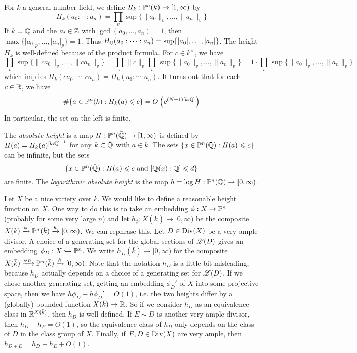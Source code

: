 \documentclass{article}
\begin{document}
For $k$ a general number field, we define $H_k:\mathbb{P}^n(k)\to [1,\infty)$ by 
\[
  H_k(a_0:\cdots:a_n) = \prod_v \sup\{ \|a_0\|_v,\dots,\|a_n\|_v\}
\]
If $k=\mathbb{Q}$ and the $a_i\in \mathbb{Z}$ with $\gcd(a_0,\dots,a_n)=1$, then 
$\max\{|a_0|_p,\dots,|a_n|_p\}=1$. Thus 
$H_{\mathbb{Q}}(a_0:\cdots:a_n)=\sup\{|a_0|,\dots,|a_n|\}$. The height $H_k$ is 
well-defined because of the product formula. For $c\in k^\times$, we have 
\[
  \prod_v \sup\{\|ca_0\|_v,\dots,\|ca_n\|_v\} = \prod_v \|c\|_v \prod_v \sup\{\|a_0\|_v,\dots,\|a_n\|_v\} = 1\cdot \prod_v \sup\{\|a_0\|_v,\dots,\|a_n\|_v\}
\]
which implies $H_k(c a_0:\cdots:c a_n)=H_k(a_0:\cdots:a_n)$. It turns out that 
for each $c\in \mathbb{R}$, we have  
\[
  \#\{a\in \mathbb{P}^n(k) : H_k(a)\leqslant c\} = O\left(c^{(N+1)[k:\mathbb{Q}]}\right)
\]
In particular, the set on the left is finite. 

The \emph{absolute height} is a map $H:\mathbb{P}^n(\bar{\mathbb{Q}})\to [1,\infty)$ is defined 
by $H(a) = H_k(a)^{[k:\mathbb{Q}]^{-1}}$ for any $k\subset \bar{\mathbb{Q}}$ with $a\in k$. 
The sets $\{x\in \mathbb{P}^n(\bar{\mathbb{Q}}):H(a)\leqslant c\}$ can be infinite, but the 
sets 
\[
  \{x\in \mathbb{P}^n(\bar{\mathbb{Q}}):H(a)\leqslant c\text{ and } [\mathbb{Q}(x):\mathbb{Q}]\leqslant d\}
\]
are finite. The \emph{logarithmic absolute height} is the map 
$h=\log H:\mathbb{P}^n(\bar{\mathbb{Q}})\to [0,\infty)$. 

Let $X$ be a nice variety over $k$. We would like to define a reasonable height 
function on $X$. One way to do this is to take an embedding $\phi:X\to \mathbb{P}^n$ 
(probably for some very large $n$) and let $h_\phi:X(\bar k)\to [0,\infty)$ be 
the composite $X(k) \xrightarrow\phi \mathbb{P}^n(\bar k) \xrightarrow{h} [0,\infty)$. 
We can rephrase this. Let $D\in \operatorname{Div}(X)$ be a very ample divisor. A choice of a 
generating set for the global sections of $\mathscr{L}(D)$ gives an embedding 
$\phi_D:X\hookrightarrow \mathbb{P}^n$. We write $h_D(\bar k)\to [0,\infty)$ for the 
composite 
$X(\bar k) \xrightarrow{\phi_D} \mathbb{P}^n(\bar k)\xrightarrow{h} [0,\infty)$. Note 
that the notation $h_D$ is a little bit misleading, because $h_D$ actually 
depends on a choice of a generating set for $\mathscr{L}(D)$. If we chose another 
generating set, getting an embedding $\phi_D'$ of $X$ into some projective 
space, then we have $h \phi_D - h \phi_D'=O(1)$, i.e. the two heights differ by 
a (globally) bounded function $X(\bar k)\to \mathbb{R}$. So if we consider 
$h_D$ as an equivalence class in $\mathbb{R}^{X(\bar k)}$, then $h_D$ is well-defined. 
If $E\sim D$ is another very ample divisor, then $h_D-h_E=O(1)$, so the 
equivalence class of $h_D$ only depends on the class of $D$ in the class group 
of $X$. Finally, if $E,D\in \operatorname{Div}(X)$ are very ample, then 
$h_{D+E}=h_D+h_E+O(1)$. 
\end{document}
